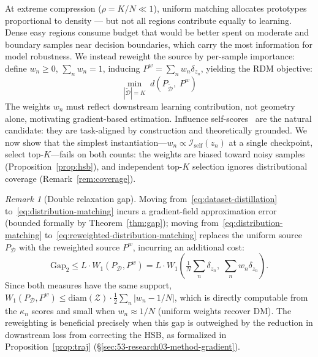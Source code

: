 \documentclass[12pt, a4paper, twoside]{book}
\numberwithin{equation}{chapter}
\theoremstyle{plain}
\theoremstyle{definition}
\theoremstyle{remark}
\newtheorem{remark}{Remark}[chapter]
\newenvironment{foldable}{}{}
\begin{document}
\begin{foldable} At extreme compression ($\rho = K/N \ll 1$), uniform matching allocates prototypes proportional to density --- but not all regions contribute equally to learning.
    Dense easy regions consume budget that would be better spent on moderate and boundary samples near decision boundaries, which carry the most information for model robustness.
    We instead reweight the source by per-sample importance: define $w_n \geq 0$, $\sum_n w_n = 1$, inducing $P^w = \sum_n w_n \delta_{z_n}$, yielding the \ac{RDM} objective:
    \begin{equation}
        \min_{|\tilde{\mathcal{D}}| = K}\; d\!\left(P_{\tilde{\mathcal{D}}},\; P^w\right)
        \label{eq:reweighted-distribution-matching}
    \end{equation}
    The weights $w_n$ must reflect downstream learning contribution, not geometry alone, motivating gradient-based estimation.
    Influence self-scores~\cite{koh2017understanding} are the natural candidate: they are task-aligned by construction and theoretically grounded.
    We now show that the simplest instantiation---$w_n \propto \mathcal{I}_\text{self}(z_n)$ at a single checkpoint, select top-$K$---fails on both counts: the weights are biased toward noisy samples (Proposition~\ref{prop:hsb}), and independent top-$K$ selection ignores distributional coverage (Remark~\ref{rem:coverage}).
    \begin{remark}[Double relaxation gap] \label{rem:double-gap}
        Moving from~\eqref{eq:dataset-distillation} to~\eqref{eq:distribution-matching} incurs a gradient-field approximation error (bounded formally by Theorem~\ref{thm:gap}); moving from~\eqref{eq:distribution-matching} to~\eqref{eq:reweighted-distribution-matching} replaces the uniform source $P_\mathcal{D}$ with the reweighted source $P^w$, incurring an additional cost:
        \begin{equation}
            \text{Gap}_2 \leq L \cdot W_1(P_\mathcal{D}, P^w) = L \cdot W_1\!\left(\tfrac{1}{N}\textstyle\sum_n \delta_{z_n},\; \textstyle\sum_n w_n \delta_{z_n}\right).
            \label{eq:gap2}
        \end{equation}
        Since both measures have the same support, $W_1(P_\mathcal{D}, P^w) \leq \text{diam}(\mathcal{Z}) \cdot \frac{1}{2}\sum_n |w_n - 1/N|$, which is directly computable from the $\kappa_n$ scores and small when $w_n \approx 1/N$ (uniform weights recover DM).
        The reweighting is beneficial precisely when this gap is outweighed by the reduction in downstream loss from correcting the \ac{HSB}, as formalized in Proposition~\ref{prop:traj} (\S\ref{sec:53-research03-method-gradient}).
    \end{remark}
\end{foldable}
\end{document}
